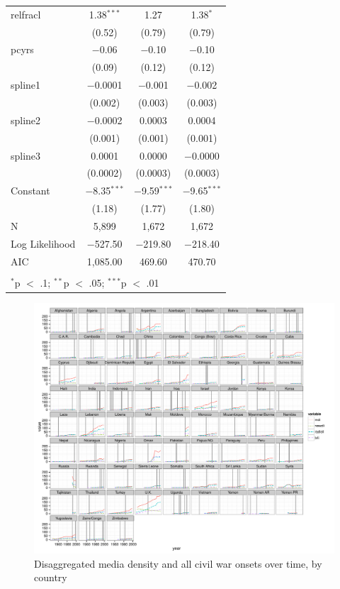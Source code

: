 \documentclass[11pt,article,oneside]{memoir}
\makeatletter
\def\maxwidth{\ifdim\Gin@nat@width>\linewidth\linewidth
\else\Gin@nat@width\fi}
\let\Oldincludegraphics\includegraphics
\renewcommand{\includegraphics}[1]{\Oldincludegraphics[width=\maxwidth]{#1}}
\makeatother
\begin{document}
\begin{table}[!htbp]
\begin{tabular}{@{\extracolsep{5pt}}lccc}
  relfracl & 1.38$^{***}$ & 1.27 & 1.38$^{*}$ \\ 
  & (0.52) & (0.79) & (0.79) \\ 
  pcyrs & $-$0.06 & $-$0.10 & $-$0.10 \\ 
  & (0.09) & (0.12) & (0.12) \\ 
  spline1 & $-$0.0001 & $-$0.001 & $-$0.002 \\ 
  & (0.002) & (0.003) & (0.003) \\ 
  spline2 & $-$0.0002 & 0.0003 & 0.0004 \\ 
  & (0.001) & (0.001) & (0.001) \\ 
  spline3 & 0.0001 & 0.0000 & $-$0.0000 \\ 
  & (0.0002) & (0.0003) & (0.0003) \\ 
  Constant & $-$8.35$^{***}$ & $-$9.59$^{***}$ & $-$9.65$^{***}$ \\ 
  & (1.18) & (1.77) & (1.80) \\ 
 N & 5,899 & 1,672 & 1,672 \\ 
Log Likelihood & $-$527.50 & $-$219.80 & $-$218.40 \\ 
AIC & 1,085.00 & 469.60 & 470.70 \\ 
\hline \\[-1.8ex] 
\multicolumn{4}{l}{$^{*}$p $<$ .1; $^{**}$p $<$ .05; $^{***}$p $<$ .01} \\ 
\end{tabular} 
\end{table}

\begin{figure}[htbp]
\centering
\includegraphics{figure/full_panel_plot.pdf}
\caption{Disaggregated media density and all civil war onsets over time,
by country}
\end{figure}
\end{document}
